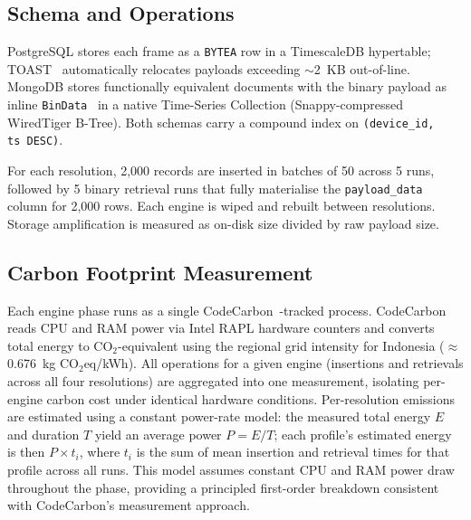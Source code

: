 \documentclass[conference]{IEEEtran}
\begin{document}
\subsection{Schema and Operations}
PostgreSQL stores each frame as a \texttt{BYTEA} row in a TimescaleDB hypertable; TOAST~\cite{postgresql_toast_docs} automatically relocates payloads exceeding $\sim$2~KB out-of-line. MongoDB stores functionally equivalent documents with the binary payload as inline \texttt{BinData}~\cite{mongodb_bson_spec} in a native Time-Series Collection (Snappy-compressed WiredTiger B-Tree). Both schemas carry a compound index on \texttt{(device\_id, ts~DESC)}.

For each resolution, 2,000 records are inserted in batches of 50 across 5 runs, followed by 5 binary retrieval runs that fully materialise the \texttt{payload\_data} column for 2,000 rows. Each engine is wiped and rebuilt between resolutions. Storage amplification is measured as on-disk size divided by raw payload size.

\subsection{Carbon Footprint Measurement}
Each engine phase runs as a single CodeCarbon~\cite{codecarbon}-tracked process. CodeCarbon reads CPU and RAM power via Intel RAPL hardware counters and converts total energy to CO$_2$-equivalent using the regional grid intensity for Indonesia ($\approx$0.676~kg CO$_2$eq/kWh). All operations for a given engine (insertions and retrievals across all four resolutions) are aggregated into one measurement, isolating per-engine carbon cost under identical hardware conditions. Per-resolution emissions are estimated using a constant power-rate model: the measured total energy $E$ and duration $T$ yield an average power $P = E/T$; each profile's estimated energy is then $P \times t_i$, where $t_i$ is the sum of mean insertion and retrieval times for that profile across all runs. This model assumes constant CPU and RAM power draw throughout the phase, providing a principled first-order breakdown consistent with CodeCarbon's measurement approach.
\end{document}
